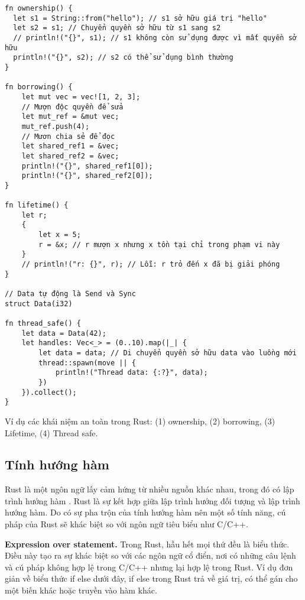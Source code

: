 \begin{listing}[H]
\begin{verbatim}
fn ownership() {
  let s1 = String::from("hello"); // s1 sở hữu giá trị "hello"
  let s2 = s1; // Chuyển quyền sở hữu từ s1 sang s2
  // println!("{}", s1); // s1 không còn sử dụng được vì mất quyền sở hữu
  println!("{}", s2); // s2 có thể sử dụng bình thường
}

fn borrowing() {
    let mut vec = vec![1, 2, 3];
    // Mượn độc quyền để sửa
    let mut_ref = &mut vec;
    mut_ref.push(4);
    // Mươn chia sẻ để đọc
    let shared_ref1 = &vec;
    let shared_ref2 = &vec;
    println!("{}", shared_ref1[0]);
    println!("{}", shared_ref2[0]);
}

fn lifetime() {
    let r;
    {
        let x = 5;
        r = &x; // r mượn x nhưng x tồn tại chỉ trong phạm vi này
    }
    // println!("r: {}", r); // Lỗi: r trỏ đến x đã bị giải phóng
}

// Data tự động là Send và Sync
struct Data(i32)

fn thread_safe() {
    let data = Data(42);
    let handles: Vec<_> = (0..10).map(|_| {
        let data = data; // Di chuyển quyền sở hữu data vào luồng mới
        thread::spawn(move || {
            println!("Thread data: {:?}", data);
        })
    }).collect();
}
\end{verbatim}
\caption{Ví dụ các khái niệm an toàn trong Rust: (1) ownership, (2) borrowing, (3) Lifetime, (4) Thread safe.}
\label{code:c2_safe_rust}
\end{listing}

\subsection{Tính hướng hàm}

Rust là một ngôn ngữ lấy cảm hứng từ nhiều nguồn khác nhau, trong đó có lập trình hướng hàm \cite{hughes1989functional}.
Rust là sự kết hợp giữa lập trình hướng đối tượng và lập trình hướng hàm.
Do có sự pha trộn của tính hướng hàm nên một số tính năng, cú pháp của Rust sẽ khác biệt so với ngôn ngữ tiêu biểu như C/C++.

\textbf{Expression over statement.}
Trong Rust, hầu hết mọi thứ đều là biểu thức.
Điều này tạo ra sự khác biệt so với các ngôn ngữ cổ điển, nơi có những câu lệnh và cú pháp không hợp lệ trong C/C++ nhưng lại hợp lệ trong Rust.
Ví dụ đơn giản về biểu thức if else dưới đây, if else trong Rust trả về giá trị, có thể gán cho một biến khác hoặc truyền vào hàm khác.

